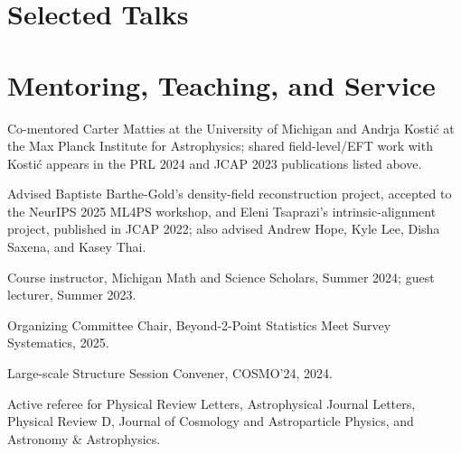\section*{Selected Talks}

\section*{Mentoring, Teaching, and Service}
\begin{tightitemize}
  \item Co-mentored Carter Matties at the University of Michigan and Andrja Kosti\'c at the Max Planck Institute for Astrophysics; shared field-level/EFT work with Kosti\'c appears in the PRL 2024 and JCAP 2023 publications listed above.
  \item Advised Baptiste Barthe-Gold's density-field reconstruction project, accepted to the NeurIPS 2025 ML4PS workshop, and Eleni Tsaprazi's intrinsic-alignment project, published in JCAP 2022; also advised Andrew Hope, Kyle Lee, Disha Saxena, and Kasey Thai.
  \item Course instructor, Michigan Math and Science Scholars, Summer 2024; guest lecturer, Summer 2023.
  \item Organizing Committee Chair, Beyond-2-Point Statistics Meet Survey Systematics, 2025.
  \item Large-scale Structure Session Convener, COSMO'24, 2024.
  \item Active referee for Physical Review Letters, Astrophysical Journal Letters, Physical Review D, Journal of Cosmology and Astroparticle Physics, and Astronomy \& Astrophysics.
\end{tightitemize}

